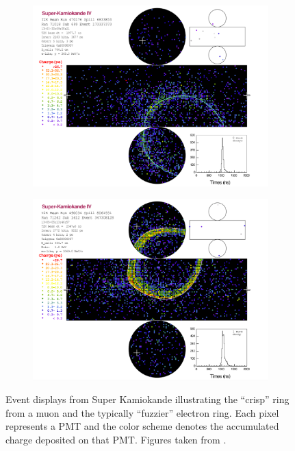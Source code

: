 \begin{figure}[h]
  \begin{subfigure}[t]{0.5\textwidth}
    \includegraphics[width=\textwidth, trim={0mm 0mm 0mm 0mm}, clip,page=1]{Figures/Simulations/NuECandidate.pdf}
  \end{subfigure}%
  \begin{subfigure}[t]{0.5\textwidth}
    \includegraphics[width=\textwidth, trim={0mm 0mm 0mm 0mm}, clip,page=1]{Figures/Simulations/NuMuCandidate.pdf}
    \subcaption{\quickmath{\nu_{\mu}}}
  \end{subfigure}
  \caption{Event displays from Super Kamiokande illustrating the ``crisp'' ring from a muon and the typically ``fuzzier'' electron ring. Each pixel represents a PMT and the color scheme denotes the accumulated charge deposited on that PMT. Figures taken from \cite{t2k_tn_219}.}
  \label{fig:Simulations_SKEventDisplays}
\end{figure}

